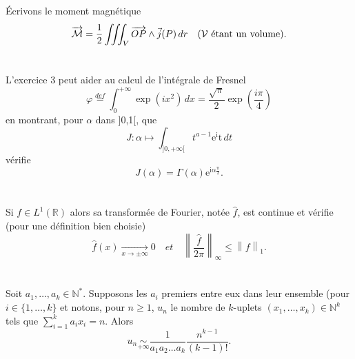 \documentclass[conference]{IEEEtran}
\begin{document}
\section{}
\noindent
Écrivons le moment magnétique
\[ \overrightarrow{\mathcal{M}} = \frac{1}{2}\iiint_V \overrightarrow{OP} \wedge \vec j(P) \, dr \text{\quad($\mathcal{V}$ étant un volume)}.\]  

\section{}
\noindent
L'exercice 3 peut aider au calcul de l'intégrale de Fresnel 
\[ \varphi \overset{def}{=} \int_0^{+\infty} \exp(ix^2) \,dx = \frac{\sqrt{\pi}}{2} \exp\left(\frac{i\pi}{4}\right) \]
en montrant, pour $\alpha$ dans ]0,1[, que 
\[ J:\alpha\longmapsto\int_{]0,+\infty[}t^{a-1}\mathrm{e^it}\,dt\]
vérifie
\[J(\alpha)=\Gamma(\alpha)\mathrm{e^{i\alpha\frac{\pi}{2}}}.\]

\section{}
\noindent
Si $f\in L^1(\mathbb{R})$ alors sa transformée de Fourier, notée $\hat{f}$, est continue et vérifie (pour une définition bien choisie)
\[\hat{f}(x) \xrightarrow[x\rightarrow\pm\infty]{}0\quad \textit{et} \quad \left\| \frac{\hat{f}}{2\pi}\right\|_\infty \leq \left\| f\right\|_{1}. \]

\section{}
\noindent
Soit $a_1,\ldots,a_k\in\mathbb{N^*}$. Supposons les $a_i$ premiers entre eux dans leur ensemble (pour $i\in \{1,\ldots,k\}$ et notons, pour $n\geq 1$, $u_n$ le nombre de $k$-uplets $(x_1,\ldots,x_k)\in\mathbb{N}^k$ tels que ${\displaystyle \sum_{i=1}^ka_ix_i=n}$. \newline
Alors
\[ u_n\underset{+\infty}{\sim}\frac{1}{a_1a_2\ldots a_k}\frac{n^{k-1}}{(k-1)!}.\]
\end{document}
